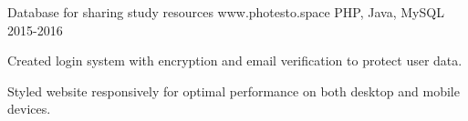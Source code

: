 \begin{cventries}
\cventry
    {Database for sharing study resources}
    {www.photesto.space}
    {PHP, Java, MySQL}
    {2015-2016}
    {
      \begin{cvitems}
        \item Created login system with encryption and email verification to protect user data.
        \item Styled website responsively for optimal performance on both desktop and mobile devices.
      \end{cvitems}
    }

\end{cventries}
